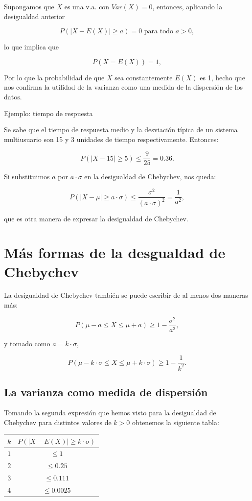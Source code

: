 \documentclass[
  letterpaper,
  DIV=11,
  numbers=noendperiod]{scrreprt}
\begin{document}
Supongamos que \(X\) es una v.a. con \(Var(X)=0\), entonces, aplicando
la desigualdad anterior

\[P(|X-E(X)|\geq a )=0\mbox{ para todo }a>0,\]

lo que implica que

\[P(X=E(X))=1,\]

Por lo que la probabilidad de que \(X\) sea constantemente \(E(X)\) es
1, hecho que nos confirma la utilidad de la varianza como una medida de
la dispersión de los datos.

Ejemplo: tiempo de respuesta

Se sabe que el tiempo de respuesta medio y la desviación típica de un
sistema multiusuario son 15 y 3 unidades de tiempo respectivamente.
Entonces:

\[
P(|X-15|\geq 5)\leq \frac9{25}=0.36.
\]

Si substituimos \(a\) por \(a\cdot \sigma\) en la desigualdad de
Chebychev, nos queda:

\[
P(|X-\mu|\geq a\cdot \sigma)\leq
\frac{\sigma^2}{(a\cdot \sigma)^2}=\frac1{a^2},
\]

que es otra manera de expresar la desigualdad de Chebychev.

\section{Más formas de la desgualdad de
Chebychev}\label{muxe1s-formas-de-la-desgualdad-de-chebychev}

La desigualdad de Chebychev también se puede escribir de al menos dos
maneras más:

\[
P(\mu-a\leq X\leq \mu+a)\geq 1-\frac{\sigma^2}{a^2},
\]

y tomado como \(a=k\cdot \sigma\),

\[
P(\mu-k\cdot \sigma\leq X\leq \mu+ k \cdot \sigma)\geq 1-\frac1{k^2}.
\]

\subsection{La varianza como medida de
dispersión}\label{la-varianza-como-medida-de-dispersiuxf3n}

Tomando la segunda expresión que hemos visto para la desigualdad de
Chebychev para distintos valores de \(k>0\) obtenemos la siguiente
tabla:

\begin{table}
\centering
\begin{tabular}{|c|c|}
$k$ &  $P\left(|X-E(X)|\geq k  \cdot \sigma\right)$\\
\hline
$1$ & $\leq 1$ \\
$2$ & $\leq 0.25$ \\
$3$ & $\leq 0.111$ \\
$4$ & $\leq 0.0025$\\ \hline
\end{tabular}
\end{table}
\end{document}
